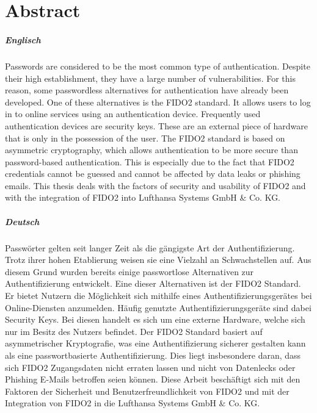 
\chapter*{Abstract}

\vspace{-2em}

\paragraph*{Englisch}
Passwords are considered to be the most common type of authentication. Despite their high establishment, they have a large number of vulnerabilities. For this reason, some passwordless alternatives for authentication have already been developed. One of these alternatives is the FIDO2 standard. It allows users to log in to online services using an authentication device. Frequently used authentication devices are security keys. These are an external piece of hardware that is only in the possession of the user. The FIDO2 standard is based on asymmetric cryptography, which allows authentication to be more secure than password-based authentication. This is especially due to the fact that FIDO2 credentials cannot be guessed and cannot be affected by data leaks or phishing emails. This thesis deals with the factors of security and usability of FIDO2 and with the integration of FIDO2 into Lufthansa Systems GmbH \& Co. KG.

\paragraph*{Deutsch}
Passwörter gelten seit langer Zeit als die gängigste Art der Authentifizierung. Trotz ihrer hohen Etablierung weisen sie eine Vielzahl an Schwachstellen auf. Aus diesem Grund wurden bereits einige passwortlose Alternativen zur Authentifizierung entwickelt. Eine dieser Alternativen ist der FIDO2 Standard. Er bietet Nutzern die Möglichkeit sich mithilfe eines Authentifizierungsgerätes bei Online-Diensten anzumelden. Häufig genutzte Authentifizierungsgeräte sind dabei Security Keys. Bei diesen handelt es sich um eine externe Hardware, welche sich nur im Besitz des Nutzers befindet. Der FIDO2 Standard basiert auf asymmetrischer Kryptografie, was eine Authentifizierung sicherer gestalten kann als eine passwortbasierte Authentifizierung. Dies liegt insbesondere daran, dass sich FIDO2 Zugangsdaten nicht erraten lassen und nicht von Datenlecks oder Phishing E-Mails betroffen seien können. Diese Arbeit beschäftigt sich mit den Faktoren der Sicherheit und Benutzerfreundlichkeit von FIDO2 und mit der Integration von FIDO2 in die Lufthansa Systems GmbH \& Co. KG.